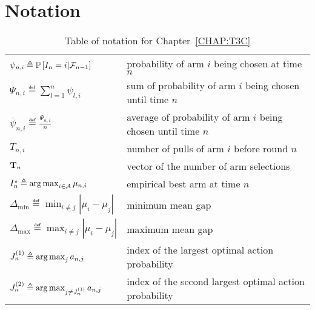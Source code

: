 \section{Notation}\label{app:notation}

\begin{table}[ht]
	\centering
	\caption{Table of notation for Chapter~\ref{CHAP:T3C}\\}
	\begin{tabular}{@{}l|l@{}}
		\toprule
		\thead{Notation} & \thead{Meaning} \\ \midrule
         $\psi_{n,i} \triangleq \mathbb{P}\left[I_n = i | \mathcal{F}_{n-1}\right]$ & probability of arm $i$ being chosen at time $n$\\
         $\Psi_{n,i} \eqdef \sum_{l=1}^n \psi_{l,i}$ & sum of probability of arm $i$ being chosen until time $n$\\
         $\bar{\psi}_{n,i} \eqdef \frac{\Psi_{n,i}}{n}$ & average of probability of arm $i$ being chosen until time $n$\\
         $T_{n,i}$ & number of pulls of arm $i$ before round $n$\\
         ${\bf T}_n$ & vector of the number of arm selections \\ 
         $I_n^\star \triangleq \operatorname*{arg\,max}_{i\in\mathcal{A}} \mu_{n,i}$ & empirical best arm at time $n$ \\
         $\Delta_{\text{min}} \eqdef \min_{i \neq j}|\mu_i-\mu_j|$ & minimum mean gap \\
         $\Delta_{\text{max}} \eqdef \max_{i \neq j}|\mu_i-\mu_j|$ & maximum mean gap \\
         $J_n^{(1)} \triangleq \operatorname*{arg\,max}_{j} a_{n,j}$ & index of the largest optimal action probability\\
         $J_n^{(2)} \triangleq \operatorname*{arg\,max}_{j\neq J_n^{(1)}} a_{n,j}$ & index of the second largest optimal action probability\\
		\bottomrule
	\end{tabular}
\end{table}

